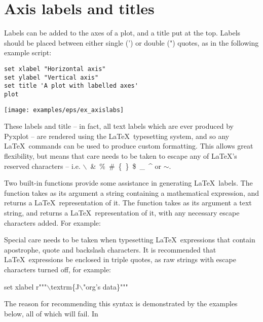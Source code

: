 \section{Axis labels and titles}
\label{sec:latex_incompatibility}

Labels can be added to the axes of a plot, and a title put at the top.  Labels
should be placed between either single (') or double (") quotes, as in the
following example script:

\begin{verbatim}
set xlabel "Horizontal axis"
set ylabel "Vertical axis"
set title 'A plot with labelled axes'
plot
\end{verbatim}

\begin{center}
\texttt{[image: examples/eps/ex\_axislabs]}
\end{center}

\noindent These labels and title -- in fact, all text labels which are ever
produced by Pyxplot -- are rendered using the \LaTeX\ typesetting system, and
so any \LaTeX\ commands can be used to produce custom formatting. This allows
great flexibility, but means that care needs to be taken to escape any of
\LaTeX's reserved characters -- i.e. $\backslash$~\&~\%~\#~\{~\}~\$~\_~\^{} or
$\sim$.

Two built-in functions provide some assistance in generating \LaTeX\ labels.
The  function takes as its argument a string containing a
mathematical expression, and returns a \LaTeX\ representation of it.  The
 function takes as its argument a text string, and returns
a \LaTeX\ representation of it, with any necessary escape characters added. For
example:

\vspace{3mm}

\vspace{3mm}

Special care needs to be taken when typesetting \LaTeX\ expressions that
contain apostrophe, quote and backslash characters.  It is recommended that
\LaTeX\ expressions be enclosed in triple quotes, as raw strings with escape
characters turned off, for example:

\begin{dodo}
set xlabel r"""$\backslash$textrm\{J$\backslash$"org's data\}"""
\end{dodo}

The reason for recommending this syntax is demonstrated by the examples below,
all of which will fail. In


